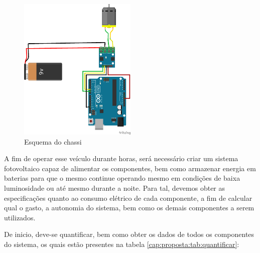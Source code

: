\begin{figure}[H]
    \centering
    \includegraphics[width=0.5\textwidth]{figuras/motor_bb.png}
    \caption{Esquema do chassi}
    \label{fig:sketchup:vaa}
\end{figure}

A fim de operar esse veículo durante horas, será necessário criar um sistema fotovoltaico capaz de alimentar os componentes, bem como armazenar energia em baterias para que o mesmo continue operando mesmo em condições de baixa luminosidade ou até mesmo durante a noite. Para tal, devemos obter as especificações quanto ao consumo elétrico de cada componente, a fim de calcular qual o gasto, a autonomia do sistema, bem como os demais componentes a serem utilizados.

De inicio, deve-se quantificar, bem como obter os dados de todos os componentes do sistema, os quais estão presentes na tabela \ref{cap:proposta:tab:quantificar}:


